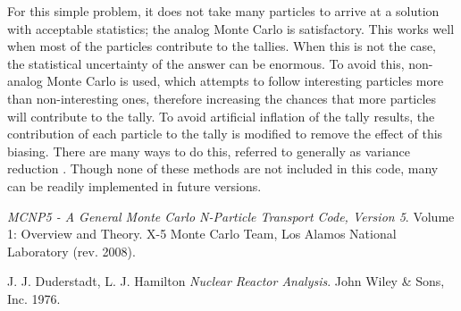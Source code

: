 \documentclass[11pt, oneside]{article}   	%
\begin{document}
For this simple problem, it does not take many particles to arrive at a solution with acceptable statistics; the analog Monte Carlo is satisfactory. This works well when most of the particles contribute to the tallies. When this is not the case, the statistical uncertainty of the answer can be enormous. To avoid this, non-analog Monte Carlo is used, which attempts to follow interesting particles more than non-interesting ones, therefore increasing the chances that more particles will contribute to the tally. To avoid artificial inflation of the tally results, the contribution of each particle to the tally is modified to remove the effect of this biasing. There are many ways to do this, referred to generally as variance reduction \cite{MCNP}. Though none of these methods are not included in this code, many can be readily implemented in future versions.

\begin{thebibliography}{9}

\textit{MCNP5 - A General Monte Carlo N-Particle Transport Code, Version 5}.
Volume 1: Overview and Theory. X-5 Monte Carlo Team, Los Alamos National Laboratory (rev. 2008).

J. J. Duderstadt, L. J. Hamilton
\textit{Nuclear Reactor Analysis}.
John Wiley \& Sons, Inc. 1976.





\end{thebibliography}

\end{document}
